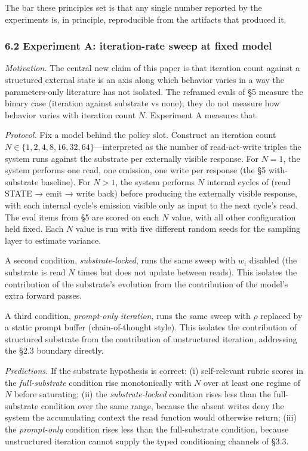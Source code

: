 \documentclass[11pt,letterpaper]{article}
\begin{document}
The bar these principles set is that any single number reported by the experiments is, in principle, reproducible from the artifacts that produced it.

\subsubsection*{6.2 Experiment A: iteration-rate sweep at fixed model}

\emph{Motivation.} The central new claim of this paper is that iteration count against a structured external state is an axis along which behavior varies in a way the parameters-only literature has not isolated. The reframed evals of §5 measure the binary case (iteration against substrate vs none); they do not measure how behavior varies with iteration count $N$. Experiment A measures that.

\emph{Protocol.} Fix a model behind the policy slot. Construct an iteration count $N \in \{1, 2, 4, 8, 16, 32, 64\}$---interpreted as the number of read-act-write triples the system runs against the substrate per externally visible response. For $N = 1$, the system performs one read, one emission, one write per response (the §5 with-substrate baseline). For $N > 1$, the system performs $N$ internal cycles of (read STATE → emit → write back) before producing the externally visible response, with each internal cycle's emission visible only as input to the next cycle's read. The eval items from §5 are scored on each $N$ value, with all other configuration held fixed. Each $N$ value is run with five different random seeds for the sampling layer to estimate variance.

A second condition, \emph{substrate-locked}, runs the same sweep with $w_i$ disabled (the substrate is read $N$ times but does not update between reads). This isolates the contribution of the substrate's evolution from the contribution of the model's extra forward passes.

A third condition, \emph{prompt-only iteration}, runs the same sweep with $\rho$ replaced by a static prompt buffer (chain-of-thought style). This isolates the contribution of structured substrate from the contribution of unstructured iteration, addressing the §2.3 boundary directly.

\emph{Predictions.} If the substrate hypothesis is correct: (i) self-relevant rubric scores in the \emph{full-substrate} condition rise monotonically with $N$ over at least one regime of $N$ before saturating; (ii) the \emph{substrate-locked} condition rises less than the full-substrate condition over the same range, because the absent writes deny the system the accumulating context the read function would otherwise return; (iii) the \emph{prompt-only} condition rises less than the full-substrate condition, because unstructured iteration cannot supply the typed conditioning channels of §3.3.
\end{document}
